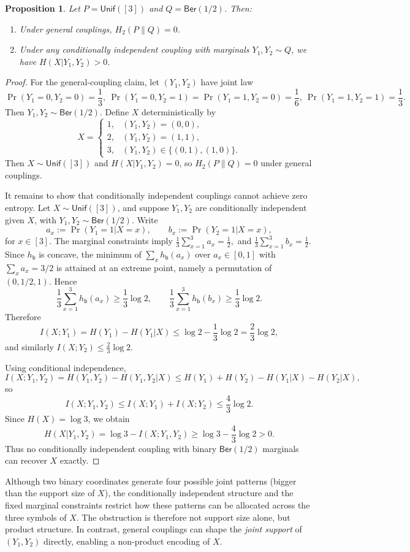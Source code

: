 \documentclass[journal]{IEEEtran}
\newtheorem{proposition}{Proposition}
\newcommand{\1}{\mathbf{1}}
\newcommand{\Ber}{\mathsf{Ber}}
\newcommand{\Unif}{\mathsf{Unif}}
\begin{document}
\begin{description}
\begin{proposition} Let $P=\Unif([3])$ and $Q=\Ber(1/2)$. Then:
\begin{enumerate}
    \item Under general couplings, $H_2(P\|Q)=0$.
    \item Under any conditionally independent coupling with marginals $Y_1,Y_2\sim Q$, we have $H(X|Y_1,Y_2)>0$.
\end{enumerate}
\end{proposition}
\begin{proof}
For the general-coupling claim, let $(Y_1,Y_2)$ have joint law
$$
\Pr(Y_1=0,Y_2=0)=\frac13,~\Pr(Y_1=0,Y_2=1)=\Pr(Y_1=1,Y_2=0)=\frac16,~\Pr(Y_1=1,Y_2=1)=\frac13.$$
Then $Y_1,Y_2\sim \Ber(1/2)$. Define $X$ deterministically by
$$X=
\begin{cases}
1, & (Y_1,Y_2)=(0,0),\\
2, & (Y_1,Y_2)=(1,1),\\
3, & (Y_1,Y_2)\in\{(0,1),(1,0)\}.
\end{cases}$$
Then $X\sim\Unif([3])$ and $H(X| Y_1,Y_2)=0$, so $H_2(P\|Q)=0$ under general couplings.

It remains to show that conditionally independent couplings cannot achieve zero entropy. Let $X\sim\Unif([3])$, and suppose $Y_1,Y_2$ are conditionally independent given $X$, with $Y_1,Y_2\sim\Ber(1/2)$. Write
$$a_x:=\Pr(Y_1=1| X=x),\qquad b_x:=\Pr(Y_2=1| X=x),$$
for $x\in[3]$. The marginal constraints imply
$\frac13\sum_{x=1}^3 a_x=\tfrac12,$ and $\frac13\sum_{x=1}^3 b_x=\tfrac12.$
Since $h_{\mathsf b}$ is concave, the minimum of $\sum_x h_{\mathsf b}(a_x)$ over $a_x\in[0,1]$ with $\sum_x a_x=3/2$ is attained at an extreme point, namely a permutation of $(0,1/2,1)$. Hence
$$
\frac13\sum_{x=1}^3 h_{\mathsf b}(a_x)\ge \frac13\log 2,
\qquad
\frac13\sum_{x=1}^3 h_{\mathsf b}(b_x)\ge \frac13\log 2.
$$
Therefore
$$
I(X;Y_1)
=
H(Y_1)-H(Y_1| X)
\le
\log 2-\frac13\log 2
=
\frac23\log 2,
$$
and similarly $I(X;Y_2)\le \frac23\log 2$.

Using conditional independence,
$$
I(X;Y_1,Y_2)
=
H(Y_1,Y_2)-H(Y_1,Y_2| X)
\le
H(Y_1)+H(Y_2)-H(Y_1| X)-H(Y_2| X),
$$
so
$$
I(X;Y_1,Y_2)\le I(X;Y_1)+I(X;Y_2)\le \frac43\log 2.
$$
Since $H(X)=\log 3$, we obtain
$$
H(X| Y_1,Y_2)
=
\log 3-I(X;Y_1,Y_2)
\ge
\log 3-\frac43\log 2
>0.
$$
Thus no conditionally independent coupling with binary $\Ber(1/2)$ marginals can recover $X$ exactly.
\end{proof}
Although two binary coordinates generate four possible joint patterns (bigger than the support size of $X$), the conditionally independent structure and the fixed marginal constraints restrict how these patterns can be allocated across the three symbols of $X$. The obstruction is therefore not support size alone, but product structure. In
contrast, general couplings can shape the \emph{joint support} of $(Y_1,Y_2)$ directly, enabling a non-product encoding of $X$.


\end{description}
\end{document}
